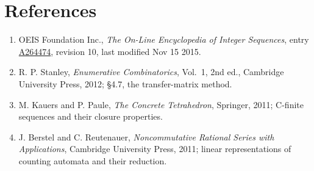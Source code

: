 \documentclass[11pt]{article}
\theoremstyle{definition}
\begin{document}
\section{References}

\begin{enumerate}

\item OEIS Foundation Inc., \emph{The On-Line Encyclopedia of Integer Sequences}, entry \href{https://oeis.org/A264474}{A264474}, revision 10, last modified Nov 15 2015.

\item R. P. Stanley, \emph{Enumerative Combinatorics}, Vol.~1, 2nd ed., Cambridge University Press, 2012; \S4.7, the transfer-matrix method.

\item M. Kauers and P. Paule, \emph{The Concrete Tetrahedron}, Springer, 2011; C-finite sequences and their closure properties.

\item J. Berstel and C. Reutenauer, \emph{Noncommutative Rational Series with Applications}, Cambridge University Press, 2011; linear representations of counting automata and their reduction.

\end{enumerate}
\end{document}
